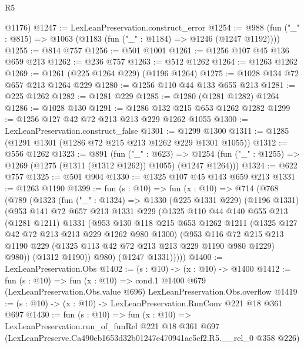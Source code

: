 \begin{lexlean}{R5}
\begin{coremodule}
      @1176)
@1247 := LexLeanPreservation.construct_error
@1254 := @988 (fun ("_" : @815) => @1063 (@1183 (fun ("_" : @1184) => @1246 (@1247 @1192))))
@1255 := @814 @757
@1256 := @501 @1001
@1261 := @1256 @107 @45 @136 @659 @213
@1262 := @236 @757
@1263 := @512 @1262
@1264 := @1263 @1262
@1269 := @1261 (@225 @1264 @229) (@1196 @1264)
@1275 := @1028 @134 @72 @657 @213 @1264 @229
@1280 := @1256 @110 @44 @133 @655 @213
@1281 := @225 @1262
@1282 := @1281 @229
@1285 := @1280 (@1281 @1282) @1264
@1286 := @1028 @130
@1291 := @1286 @132 @215 @653 @1262 @1282
@1299 := @1256 @127 @42 @72 @213 @213 @229 @1262 @1055
@1300 := LexLeanPreservation.construct_false
@1301 := @1299 @1300
@1311 := @1285 (@1291 @1301 (@1286 @72 @215 @213 @1262 @229 @1301 @1055))
@1312 := @556 @1262
@1323 := @891
    (fun ("_" : @623) =>
    @1254 (fun ("_" : @1255) => @1269 (@1275 (@1311 (@1312 @1262)) @1055) (@1247 @1264)))
@1324 := @622 @757
@1325 := @501 @904
@1330 := @1325 @107 @45 @143 @659 @213
@1331 := @1263 @1190
@1399 := fun (s : @10) =>
  fun (x : @10) =>
  @714
    (@768
      (@789
        (@1323
          (fun ("_" : @1324) =>
          @1330
            (@225 @1331 @229)
            (@1196 @1331)
            (@953
              @141
              @72
              @657
              @213
              @1331
              @229
              (@1325
                @110
                @44
                @140
                @655
                @213
                (@1281 @1211)
                @1331
                (@953
                  @130
                  @118
                  @215
                  @653
                  @1262
                  @1211
                  (@1325 @127 @42 @72 @213 @213 @229 @1262 @980 @1300)
                  (@953
                    @116
                    @72
                    @215
                    @213
                    @1190
                    @229
                    (@1325 @113 @42 @72 @213 @213 @229 @1190 @980 @1229)
                    @980))
                (@1312 @1190))
              @980)
            (@1247 @1331)))))
@1400 := LexLeanPreservation.Obs
@1402 := (s : @10) -> (x : @10) -> @1400
@1412 := fun (s : @10) =>
  fun (x : @10) =>
  cond.{1} @1400 @679 (LexLeanPreservation.Obs.value @696) LexLeanPreservation.Obs.overflow
@1419 := (s : @10) -> (x : @10) -> LexLeanPreservation.RunConv @221 @18 @361 @697
@1430 := fun (s : @10) =>
  fun (x : @10) =>
  LexLeanPreservation.run_of_funRel
    @221
    @18
    @361
    @697
    (LexLeanPreserve.Ca490cb1653d32b01247e470941ac5cf2.R5.__rel_0 @358 @226)
\end{coremodule}
\end{lexlean}
